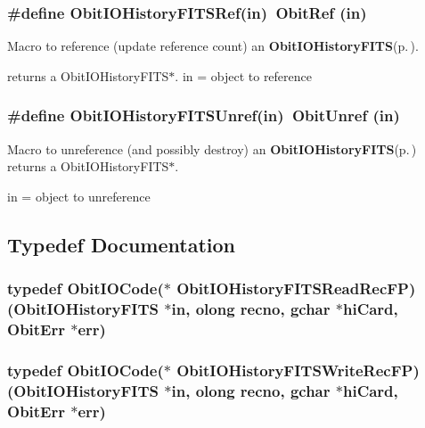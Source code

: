 \subsubsection{\setlength{\rightskip}{0pt plus 5cm}\#define Obit\-IOHistory\-FITSRef(in)\ Obit\-Ref (in)}\label{ObitIOHistoryFITS_8h_a1}


Macro to reference (update reference count) an {\bf Obit\-IOHistory\-FITS}{\rm (p.\,\pageref{structObitIOHistoryFITS})}. 

returns a Obit\-IOHistory\-FITS$\ast$. in = object to reference 
\subsubsection{\setlength{\rightskip}{0pt plus 5cm}\#define Obit\-IOHistory\-FITSUnref(in)\ Obit\-Unref (in)}\label{ObitIOHistoryFITS_8h_a0}


Macro to unreference (and possibly destroy) an {\bf Obit\-IOHistory\-FITS}{\rm (p.\,\pageref{structObitIOHistoryFITS})} returns a Obit\-IOHistory\-FITS$\ast$. 

in = object to unreference 

\subsection{Typedef Documentation}
\subsubsection{\setlength{\rightskip}{0pt plus 5cm}typedef Obit\-IOCode($\ast$ {\bf Obit\-IOHistory\-FITSRead\-Rec\-FP})({\bf Obit\-IOHistory\-FITS} $\ast$in, {\bf olong} recno, gchar $\ast$hi\-Card, {\bf Obit\-Err} $\ast$err)}\label{ObitIOHistoryFITS_8h_a3}


\subsubsection{\setlength{\rightskip}{0pt plus 5cm}typedef Obit\-IOCode($\ast$ {\bf Obit\-IOHistory\-FITSWrite\-Rec\-FP})({\bf Obit\-IOHistory\-FITS} $\ast$in, {\bf olong} recno, gchar $\ast$hi\-Card, {\bf Obit\-Err} $\ast$err)}\label{ObitIOHistoryFITS_8h_a4}




